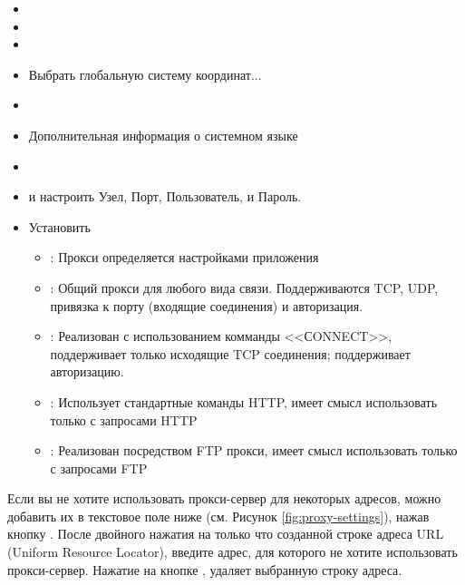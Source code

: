 
\begin{itemize}
\item {}
\item {}
\item {}
\item Выбрать глобальную систему координат...
\end{itemize}


\begin{itemize}
\item {}
\item Дополнительная информация о системном языке
\end{itemize}


\begin{itemize}
\item {}
\item {} и настроить Узел, Порт, Пользователь, и Пароль.
\item Установить 
 \begin{itemize}
  \item {}: Прокси определяется настройками приложения
  \item {}: Общий прокси для любого вида связи. Поддерживаются TCP, UDP, привязка к порту (входящие соединения) и авторизация.
  \item {}: Реализован с использованием комманды <<СONNECT>>, поддерживает только исходящие TCP соединения; поддерживает авторизацию.
  \item {}: Использует стандартные команды HTTP, имеет смысл использовать только с запросами HTTP
  \item {}: Реализован посредством FTP прокси, имеет смысл использовать только с запросами FTP
 \end{itemize}
\end{itemize}

Если вы не хотите использовать прокси-сервер для некоторых адресов, можно добавить их в текстовое поле ниже (см. Рисунок \ref{fig:proxy-settings}), нажав кнопку . После двойного нажатия на только что созданной строке адреса URL (Uniform Resource Locator), введите адрес, для которого не хотите использовать прокси-сервер. Нажатие на кнопке , удаляет выбранную строку адреса.

